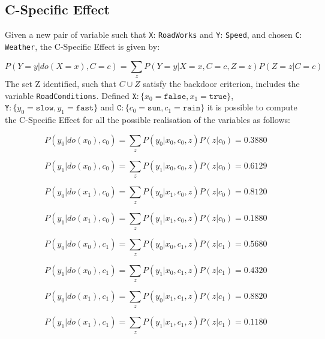 \documentclass[a4paper,12pt]{article} %
\begin{document}
\subsection*{C-Specific Effect}
Given a new pair of variable such that \texttt{X}: \texttt{RoadWorks} and \texttt{Y}: \texttt{Speed}, and chosen \texttt{C}: \texttt{Weather}, the C-Specific Effect is given by:

\begin{equation}
P(Y=y|do(X=x), C=c)= \sum_{z} P(Y=y|X=x, C=c, Z=z) P(Z=z|C=c)
\end{equation}
The set Z identified, such that $C \cup Z$ satisfy the backdoor criterion, includes the variable \texttt{RoadConditions}.
Defined $\mathtt{X}: \{ x_0=\mathtt{false}, x_1=\mathtt{true}\}$, $\mathtt{Y}: \{ y_0=\mathtt{slow}, y_1=\mathtt{fast}\}$ and $\mathtt{C}: \{ c_0=\mathtt{sun}, c_1=\mathtt{rain}\}$ it is possible to compute the C-Specific Effect for all the possible realisation of the variables as follows: 

\begin{equation*}
P(y_0|do(x_0), c_0)= \sum_{z} P(y_0|x_0, c_0, z) P(z|c_0)=0.3880
\end{equation*}

\begin{equation*}
P(y_1|do(x_0), c_0)= \sum_{z} P(y_1|x_0, c_0, z) P(z|c_0)=0.6129
\end{equation*}

\begin{equation*}
P(y_0|do(x_1), c_0)= \sum_{z} P(y_0|x_1, c_0, z) P(z|c_0)=0.8120
\end{equation*}

\begin{equation*}
P(y_1|do(x_1), c_0)= \sum_{z} P(y_1|x_1, c_0, z) P(z|c_0)=0.1880
\end{equation*}

\begin{equation*}
P(y_0|do(x_0), c_1)= \sum_{z} P(y_0|x_0, c_1, z) P(z|c_1)=0.5680
\end{equation*}

\begin{equation*}
P(y_1|do(x_0), c_1)= \sum_{z} P(y_1|x_0, c_1, z) P(z|c_1)=0.4320
\end{equation*}

\begin{equation*}
P(y_0|do(x_1), c_1)= \sum_{z} P(y_0|x_1, c_1, z) P(z|c_1)=0.8820
\end{equation*}

\begin{equation*}
P(y_1|do(x_1), c_1)= \sum_{z} P(y_1|x_1, c_1, z) P(z|c_1)=0.1180
\end{equation*}
\end{document}

